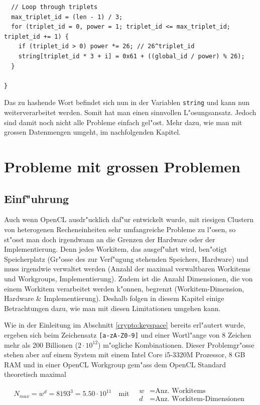 \begin{refsection}
\begin{small}
\begin{verbatim}
  // Loop through triplets
  max_triplet_id = (len - 1) / 3;
  for (triplet_id = 0, power = 1; triplet_id <= max_triplet_id; triplet_id += 1) {
    if (triplet_id > 0) power *= 26; // 26^triplet_id
    string[triplet_id * 3 + i] = 0x61 + ((global_id / power) % 26);
  }

}
\end{verbatim}
\end{small}

\noindent Das zu hashende Wort befindet sich nun in der Variablen
\texttt{string} und kann nun weiterverarbeitet werden. Somit hat man einen
sinnvollen L"osungsansatz. Jedoch sind damit noch nicht alle Probleme einfach
gel"ost. Mehr dazu, wie man mit grossen Datenmengen umgeht, im nachfolgenden
Kapitel.


\section{Probleme mit grossen Problemen}
\label{crypto:grosse_probleme}

\subsection{Einf"uhrung}

Auch wenn OpenCL ausdr"ucklich daf"ur entwickelt wurde, mit riesigen Clustern
von heterogenen Recheneinheiten sehr umfangreiche Probleme zu l"osen, so st"osst
man doch irgendwann an die Grenzen der Hardware oder der Implementierung.  Denn
jedes Workitem, das ausgef"uhrt wird, ben"otigt Speicherplatz (Gr"osse des zur
Verf"ugung stehenden Speichers, Hardware) und muss irgendwie verwaltet werden
(Anzahl der maximal verwaltbaren Workitems und Workgroups, Implementierung).
Zudem ist die Anzahl Dimensionen, die von einem Workitem verarbeitet werden
k"onnen, begrenzt (Workitem-Dimension, Hardware \& Implementierung). Deshalb
folgen in diesem Kapitel einige Betrachtungen dazu, wie man mit diesen
Limitationen umgehen kann.

Wie in der Einleitung im Abschnitt \ref{crypto:keyspace} bereits erl"autert
wurde, ergeben sich beim Zeichensatz \texttt{[a-zA-Z0-9]} und einer Wortl"ange
von 8 Zeichen mehr als 200 Billionen ($2 \cdot 10^{12}$) m"ogliche Kombinationen.
Dieser Problemgr"osse stehen aber auf einem System mit einem Intel Core i5-3320M
Prozessor, 8 GB RAM und in einer OpenCL Workgroup gem"ass dem OpenCL Standard
theoretisch maximal

\[
	N_{max} = w^d = 8193^{3} = 5.50 \cdot 10^{11} \quad\textrm{mit}\quad
	\begin{aligned}
		w &= \textrm{Anz. Workitems}\\
		d &= \textrm{Anz. Workitem-Dimensionen}
	\end{aligned}
\]


\end{refsection}
